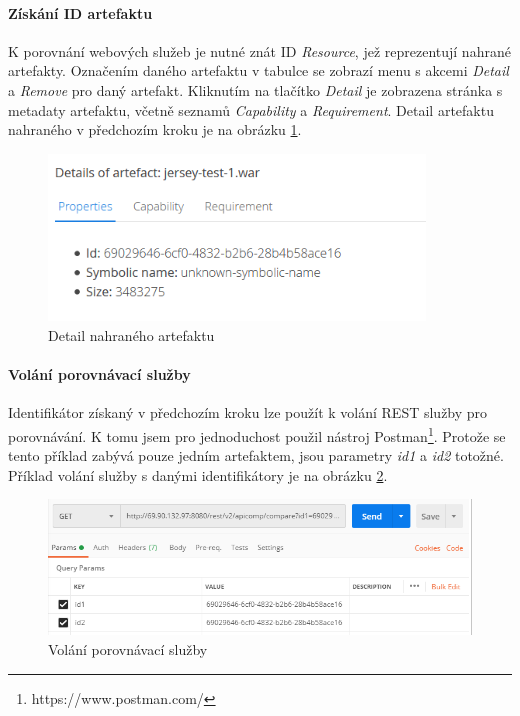 \documentclass[czech,DP]{thesiskiv}
\begin{document}
\paragraph{Získání ID artefaktu}
K porovnání webových služeb je nutné znát ID \textit{Resource}, jež reprezentují nahrané artefakty. Označením daného artefaktu v tabulce se zobrazí menu s akcemi \textit{Detail} a \textit{Remove} pro daný artefakt. Kliknutím na tlačítko \textit{Detail} je zobrazena stránka s metadaty artefaktu, včetně seznamů \textit{Capability} a \textit{Requirement}. Detail artefaktu nahraného v předchozím kroku je na obrázku \ref{fig:crce-art-detail}.

\begin{figure}[h]
	\centering
	\includegraphics[width=10cm]{crce-art-detail.png}
	\caption{Detail nahraného artefaktu}
	\label{fig:crce-art-detail}
\end{figure}

\paragraph{Volání porovnávací služby}
Identifikátor získaný v předchozím kroku lze použít k volání REST služby pro porovnávání. K tomu jsem pro jednoduchost použil nástroj Postman\footnote{https://www.postman.com/}. Protože se tento příklad zabývá pouze jedním artefaktem, jsou parametry \textit{id1} a \textit{id2} totožné. Příklad volání služby s danými identifikátory je na obrázku \ref{fig:apicomp-call}.

\begin{figure}[h]
	\centering
	\includegraphics[width=\linewidth]{apicomp-call.png}
	\caption{Volání porovnávací služby}
	\label{fig:apicomp-call}
\end{figure}
\end{document}
